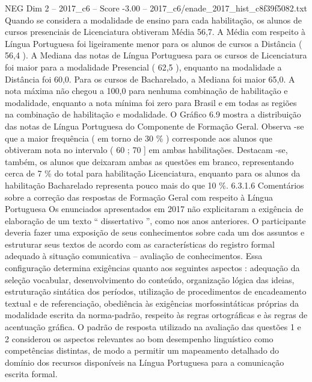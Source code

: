 \begin{textsample}{NEG Dim 2 – 2017\_c6 – Score -3.00 – 2017\_c6/enade\_2017\_hist\_c8f39f5082.txt}
Quando se considera a modalidade de ensino para cada habilitação, os alunos de cursos presenciais de Licenciatura obtiveram Média 56,7.
A Média com respeito à Língua Portuguesa foi ligeiramente menor para os alunos de cursos a Distância ( 56,4 ).
A Mediana das notas de Língua Portuguesa para os cursos de Licenciatura foi maior para a modalidade Presencial ( 62,5 ), enquanto na modalidade a Distância foi 60,0.
Para os cursos de Bacharelado, a Mediana foi maior 65,0.
A nota máxima não chegou a 100,0 para nenhuma combinação de habilitação e modalidade, enquanto a nota mínima foi zero para Brasil e em todas as regiões na combinação de habilitação e modalidade.
O Gráfico 6.9 mostra a distribuição das notas de Língua Portuguesa do Componente de Formação Geral.
Observa -se que a maior frequência ( em torno de 30 \% ) corresponde aos alunos que obtiveram nota no intervalo ( 60 ; 70 ] em ambas habilitações.
Destacam -se, também, os alunos que deixaram ambas as questões em branco, representando cerca de 7 \% do total para habilitação Licenciatura, enquanto para os alunos da habilitação Bacharelado representa pouco mais do que 10 \%. 6.3.1.6 Comentários sobre a correção das respostas de Formação Geral com respeito à Língua Portuguesa Os enunciados apresentados em 2017 não explicitaram a exigência de elaboração de um texto “ dissertativo ”, como nos anos anteriores.
O participante deveria fazer uma exposição de seus conhecimentos sobre cada um dos assuntos e estruturar seus textos de acordo com as características do registro formal adequado à situação comunicativa – avaliação de conhecimentos.
Essa configuração determina exigências quanto aos seguintes aspectos : adequação da seleção vocabular, desenvolvimento do conteúdo, organização lógica das ideias, estruturação sintática dos períodos, utilização de procedimentos de encadeamento textual e de referenciação, obediência às exigências morfossintáticas próprias da modalidade escrita da norma-padrão, respeito às regras ortográficas e às regras de acentuação gráfica.
O padrão de resposta utilizado na avaliação das questões 1 e 2 considerou os aspectos relevantes ao bom desempenho linguístico como competências distintas, de modo a permitir um mapeamento detalhado do domínio dos recursos disponíveis na Língua Portuguesa para a comunicação escrita formal.

\end{textsample}
